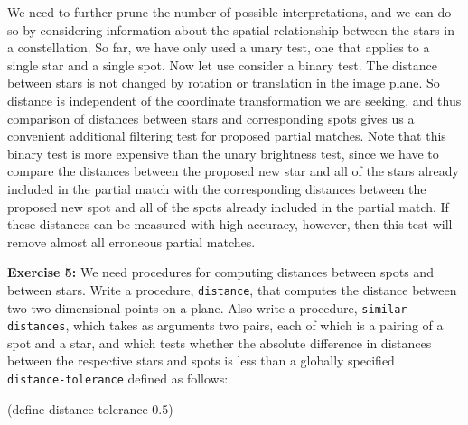 \null

We need to further prune the number of possible interpretations, and we can do
so by considering information about the spatial relationship between the stars
in a constellation.  So far, we have only used a unary test, one that applies
to a single star and a single spot.  Now let use consider a binary test.  The
distance between stars is not changed by rotation or translation in the image
plane.  So distance is independent of the coordinate transformation we are
seeking, and thus comparison of distances between stars and corresponding spots
gives us a convenient additional filtering test for proposed partial matches.
Note that this binary test is more expensive than the unary brightness test,
since we have to compare the distances between the proposed new star and all of
the stars already included in the partial match with the corresponding
distances between the proposed new spot and all of the spots already included
in the partial match.  If these distances can be measured with high accuracy,
however, then this test will remove almost all erroneous partial matches.

{\bf Exercise 5:}
We need procedures for computing distances between spots and between
stars.  Write a procedure, {\tt distance}, that computes the distance
between two two-dimensional points on a plane.  Also
write a procedure, {\tt similar-distances}, which takes as arguments two
pairs, each of which is a pairing of a spot and a star, and which tests
whether the absolute difference in distances between the respective
stars and spots is less than a globally specified {\tt
distance-tolerance} defined as follows:

\beginlisp
(define distance-tolerance 0.5)
\endlisp


\null

